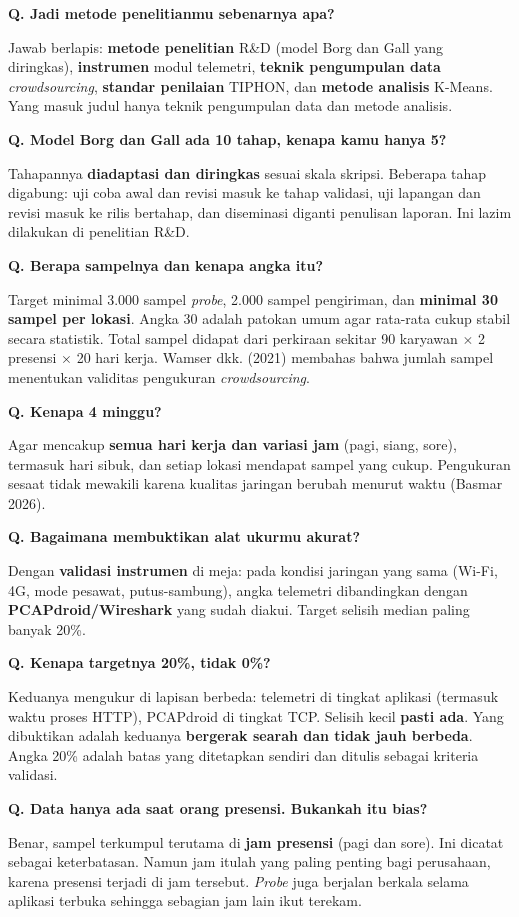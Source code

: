 \documentclass[11pt,a4paper]{article}
\newcounter{q}
\newcommand{\tanya}[2]{\stepcounter{q}%
\par\vspace{6pt}\noindent\colorbox{band}{\parbox{\dimexpr\linewidth-2\fboxsep}{\textbf{Q\arabic{q}. #1}}}\par\vspace{2pt}#2\par}
\begin{document}
\tanya{Jadi metode penelitianmu sebenarnya apa?}{Jawab berlapis: \textbf{metode penelitian} R\&D (model Borg dan Gall yang diringkas), \textbf{instrumen} modul telemetri, \textbf{teknik pengumpulan data} \textit{crowdsourcing}, \textbf{standar penilaian} TIPHON, dan \textbf{metode analisis} K-Means. Yang masuk judul hanya teknik pengumpulan data dan metode analisis.}

\tanya{Model Borg dan Gall ada 10 tahap, kenapa kamu hanya 5?}{Tahapannya \textbf{diadaptasi dan diringkas} sesuai skala skripsi. Beberapa tahap digabung: uji coba awal dan revisi masuk ke tahap validasi, uji lapangan dan revisi masuk ke rilis bertahap, dan diseminasi diganti penulisan laporan. Ini lazim dilakukan di penelitian R\&D.}

\tanya{Berapa sampelnya dan kenapa angka itu?}{Target minimal 3.000 sampel \textit{probe}, 2.000 sampel pengiriman, dan \textbf{minimal 30 sampel per lokasi}. Angka 30 adalah patokan umum agar rata-rata cukup stabil secara statistik. Total sampel didapat dari perkiraan sekitar 90 karyawan $\times$ 2 presensi $\times$ 20 hari kerja. Wamser dkk. (2021) membahas bahwa jumlah sampel menentukan validitas pengukuran \textit{crowdsourcing}.}

\tanya{Kenapa 4 minggu?}{Agar mencakup \textbf{semua hari kerja dan variasi jam} (pagi, siang, sore), termasuk hari sibuk, dan setiap lokasi mendapat sampel yang cukup. Pengukuran sesaat tidak mewakili karena kualitas jaringan berubah menurut waktu (Basmar 2026).}

\tanya{Bagaimana membuktikan alat ukurmu akurat?}{Dengan \textbf{validasi instrumen} di meja: pada kondisi jaringan yang sama (Wi-Fi, 4G, mode pesawat, putus-sambung), angka telemetri dibandingkan dengan \textbf{PCAPdroid/Wireshark} yang sudah diakui. Target selisih median paling banyak 20\%.}

\tanya{Kenapa targetnya 20\%, tidak 0\%?}{Keduanya mengukur di lapisan berbeda: telemetri di tingkat aplikasi (termasuk waktu proses HTTP), PCAPdroid di tingkat TCP. Selisih kecil \textbf{pasti ada}. Yang dibuktikan adalah keduanya \textbf{bergerak searah dan tidak jauh berbeda}. Angka 20\% adalah batas yang ditetapkan sendiri dan ditulis sebagai kriteria validasi.}

\tanya{Data hanya ada saat orang presensi. Bukankah itu bias?}{Benar, sampel terkumpul terutama di \textbf{jam presensi} (pagi dan sore). Ini dicatat sebagai keterbatasan. Namun jam itulah yang paling penting bagi perusahaan, karena presensi terjadi di jam tersebut. \textit{Probe} juga berjalan berkala selama aplikasi terbuka sehingga sebagian jam lain ikut terekam.}
\end{document}
